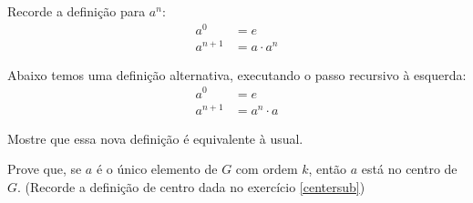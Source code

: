 \begin{exercise}
	Recorde a definição para $a^n$:
	\begin{align*}
		a^0 &= e \\
		a^{n+1} &= a \cdot a^n
	\end{align*}

	Abaixo temos uma definição alternativa, executando o passo recursivo à esquerda:
	\begin{align*}
		a^0 &= e \\
		a^{n+1} &= a^n \cdot a
	\end{align*} 

	Mostre que essa nova definição é equivalente à usual. 
\end{exercise}

\begin{exercise}
	Prove que, se $a$ é o único elemento de $G$ com ordem $k$, então $a$ está no centro de $G$.
	(Recorde a definição de centro dada no exercício \ref{centersub})
\end{exercise}